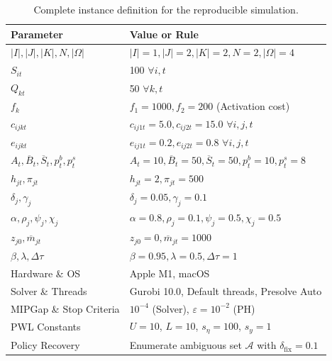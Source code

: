 \documentclass[11pt,a4paper]{article}
\begin{document}
\begin{table}[ht]\small
\centering
\caption{Complete instance definition for the reproducible simulation.}
\begin{tabular}{ll}
\toprule
\textbf{Parameter} & \textbf{Value or Rule} \\
\midrule
$|I|, |J|, |K|, N, |\Omega|$ & $|I|=1, |J|=2, |K|=2, N=2, |\Omega|=4$ \\
$S_{it}$ & 100 $\forall i, t$ \\
$Q_{kt}$ & 50 $\forall k, t$ \\
$f_k$ & $f_1=1000, f_2=200$ (Activation cost) \\
$c_{ijkt}$ & $c_{ij1t}=5.0, c_{ij2t}=15.0$ $\forall i, j, t$ \\
$e_{ijkt}$ & $e_{ij1t}=0.2, e_{ij2t}=0.8$ $\forall i, j, t$ \\
$A_t, \overline{B}_t, \overline{S}_t, p_t^b, p_t^s$ & $A_t=10, \overline{B}_t=50, \overline{S}_t=50, p_t^b=10, p_t^s=8$ \\
$h_{jt}, \pi_{jt}$ & $h_{jt}=2, \pi_{jt}=500$ \\
$\delta_j, \gamma_j$ & $\delta_j=0.05, \gamma_j=0.1$ \\
$\alpha, \rho_j, \psi_j, \chi_j$ & $\alpha=0.8, \rho_j=0.1, \psi_j=0.5, \chi_j=0.5$ \\
$z_{j0}, \overline{m}_{jt}$ & $z_{j0}=0, \overline{m}_{jt}=1000$ \\
$\beta, \lambda, \Delta\tau$ & $\beta=0.95, \lambda=0.5, \Delta\tau=1$ \\
Hardware \& OS & Apple M1, macOS \\
Solver \& Threads & Gurobi 10.0, Default threads, Presolve Auto \\
MIPGap \& Stop Criteria & $10^{-4}$ (Solver), $\varepsilon=10^{-2}$ (PH) \\
PWL Constants & $U=10$, $L=10$, $s_\eta=100$, $s_y=1$ \\
Policy Recovery & Enumerate ambiguous set $\mathcal{A}$ with $\delta_{\mathrm{fix}} = 0.1$ \\
\bottomrule
\end{tabular}
\label{tab:instance_def}
\end{table}
\end{document}
